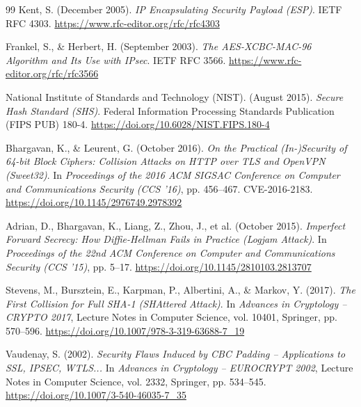 \documentclass[11pt,a4paper]{article}
\begin{document}
\begin{thebibliography}{99}
Kent, S. (December 2005).
\textit{IP Encapsulating Security Payload (ESP)}.
IETF RFC 4303.
\url{https://www.rfc-editor.org/rfc/rfc4303}

Frankel, S., \& Herbert, H. (September 2003).
\textit{The AES-XCBC-MAC-96 Algorithm and Its Use with IPsec}.
IETF RFC 3566.
\url{https://www.rfc-editor.org/rfc/rfc3566}

National Institute of Standards and Technology (NIST). (August 2015).
\textit{Secure Hash Standard (SHS)}.
Federal Information Processing Standards Publication (FIPS PUB) 180-4.
\url{https://doi.org/10.6028/NIST.FIPS.180-4}

Bhargavan, K., \& Leurent, G. (October 2016).
\textit{On the Practical (In-)Security of 64-bit Block Ciphers: Collision Attacks on HTTP over TLS and OpenVPN (Sweet32)}.
In \textit{Proceedings of the 2016 ACM SIGSAC Conference on Computer and Communications Security (CCS '16)}, pp. 456--467. CVE-2016-2183.
\url{https://doi.org/10.1145/2976749.2978392}

Adrian, D., Bhargavan, K., Liang, Z., Zhou, J., et al. (October 2015).
\textit{Imperfect Forward Secrecy: How Diffie-Hellman Fails in Practice (Logjam Attack)}.
In \textit{Proceedings of the 22nd ACM Conference on Computer and Communications Security (CCS '15)}, pp. 5--17.
\url{https://doi.org/10.1145/2810103.2813707}

Stevens, M., Bursztein, E., Karpman, P., Albertini, A., \& Markov, Y. (2017).
\textit{The First Collision for Full SHA-1 (SHAttered Attack)}.
In \textit{Advances in Cryptology -- CRYPTO 2017}, Lecture Notes in Computer Science, vol. 10401, Springer, pp. 570--596.
\url{https://doi.org/10.1007/978-3-319-63688-7_19}

Vaudenay, S. (2002).
\textit{Security Flaws Induced by CBC Padding -- Applications to SSL, IPSEC, WTLS...}
In \textit{Advances in Cryptology -- EUROCRYPT 2002}, Lecture Notes in Computer Science, vol. 2332, Springer, pp. 534--545.
\url{https://doi.org/10.1007/3-540-46035-7_35}

\end{thebibliography}
\end{document}
